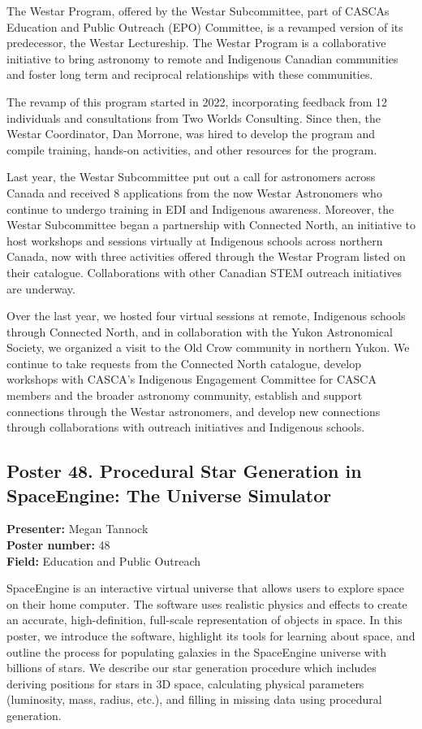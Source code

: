The Westar Program, offered by the Westar Subcommittee, part of CASCAs Education and Public Outreach (EPO) Committee, is a revamped version of its predecessor, the Westar Lectureship. The Westar Program is a collaborative initiative to bring astronomy to remote and Indigenous Canadian communities and foster long term and reciprocal relationships with these communities.

The revamp of this program started in 2022, incorporating feedback from 12 individuals and consultations from Two Worlds Consulting. Since then, the Westar Coordinator, Dan Morrone, was hired to develop the program and compile training, hands-on activities, and other resources for the program.

Last year, the Westar Subcommittee put out a call for astronomers across Canada and received 8 applications from the now Westar Astronomers who continue to undergo training in EDI and Indigenous awareness. Moreover, the Westar Subcommittee began a partnership with Connected North, an initiative to host workshops and sessions virtually at Indigenous schools across northern Canada, now with three activities offered through the Westar Program listed on their catalogue. Collaborations with other Canadian STEM outreach initiatives are underway.

Over the last year, we hosted four virtual sessions at remote, Indigenous schools through Connected North, and in collaboration with the Yukon Astronomical Society, we organized a visit to the Old Crow community in northern Yukon. We continue to take requests from the Connected North catalogue, develop workshops with CASCA's Indigenous Engagement Committee for CASCA members and the broader astronomy community, establish and support connections through the Westar astronomers, and develop new connections through collaborations with outreach initiatives and Indigenous schools.

\hypertarget{poster-abstract-talk-133}{}\label{poster-abstract-page-talk-133}
\subsection*{Poster 48. Procedural Star Generation in SpaceEngine: The Universe Simulator}
\textbf{Presenter:} Megan Tannock\\
\textbf{Poster number:} 48\\
\textbf{Field:} Education and Public Outreach

SpaceEngine is an interactive virtual universe that allows users to explore space on their home computer. The software uses realistic physics and effects to create an accurate, high-definition, full-scale representation of objects in space. In this poster, we introduce the software, highlight its tools for learning about space, and outline the process for populating galaxies in the SpaceEngine universe with billions of stars. We describe our star generation procedure which includes deriving positions for stars in 3D space, calculating physical parameters (luminosity, mass, radius, etc.), and filling in missing data using procedural generation.

